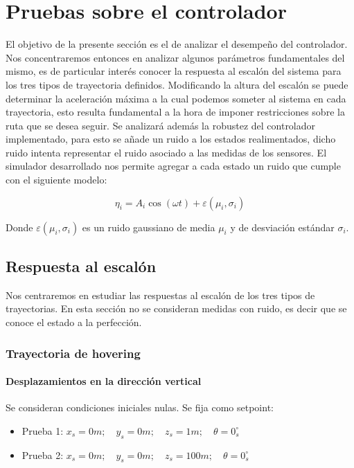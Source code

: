 \documentclass[main]{subfiles}
\begin{document}
\chapter{Pruebas sobre el controlador}
\label{chap:test_control}

El objetivo de la presente secci\'on es el de analizar el desempeño del controlador. Nos concentraremos entonces en analizar algunos par\'ametros fundamentales del mismo, es de particular inter\'es conocer la respuesta al escal\'on del sistema para los tres tipos de trayectoria definidos. Modificando la altura del escal\'on se puede determinar la aceleraci\'on m\'axima a la cual podemos someter al sistema en cada trayectoria, esto resulta fundamental a la hora de imponer restricciones sobre la ruta que se desea seguir. Se analizar\'a adem\'as la robustez del controlador implementado, para esto se añade un ruido a los estados realimentados, dicho ruido intenta representar el ruido asociado a las medidas de los sensores. El simulador desarrollado nos permite agregar a cada estado un ruido que cumple con el siguiente modelo:

\begin{equation}
\label{eq:noise}
\eta_i = A_i\cos(\omega t)+\varepsilon(\mu_i,\sigma_i)
\end{equation}

Donde $\varepsilon(\mu_i,\sigma_i)$ es un ruido gaussiano de media $\mu_i$ y de desviaci\'on est\'andar $\sigma_i$.

\section{Respuesta al escal\'on}
Nos centraremos en estudiar las respuestas al escal\'on de los tres tipos de trayectorias. En esta secci\'on no se consideran medidas con ruido, es decir que se conoce el estado a la perfecci\'on.  

\subsection{Trayectoria de hovering}

\subsubsection{Desplazamientos en la direcci\'on vertical}
Se consideran condiciones iniciales nulas. Se fija como setpoint:
\begin{itemize}
\item Prueba 1: ${x_s = 0 m;\quad y_s = 0 m;\quad z_s = 1 m;\quad \theta = 0_s^\circ}$
\item Prueba 2: ${x_s = 0 m;\quad y_s = 0 m;\quad z_s = 100 m;\quad \theta = 0_s^\circ}$
\end{itemize}
\end{document}
